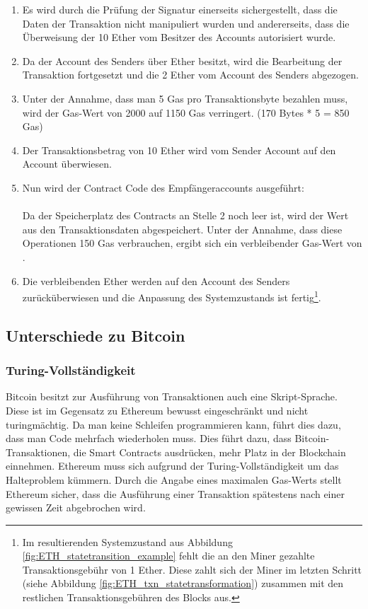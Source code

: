 \begin{enumerate}
\item Es wird durch die Prüfung der Signatur einerseits sichergestellt, dass die Daten der Transaktion nicht manipuliert wurden und andererseits, dass die Überweisung der 10 Ether vom Besitzer des Accounts  autorisiert wurde. 
\item Da der Account des Senders über  Ether besitzt, wird die Bearbeitung der Transaktion fortgesetzt und die 2 Ether vom Account des Senders abgezogen.
\item Unter der Annahme, dass man 5 Gas pro Transaktionsbyte bezahlen muss, wird der Gas-Wert von 2000 auf 1150 Gas verringert. (170 Bytes * 5 = 850 Gas) 
\item Der Transaktionsbetrag von 10 Ether wird vom Sender Account  auf den Account  überwiesen.
\item Nun wird der Contract Code des Empfängeraccounts ausgeführt:\\ \\
Da der Speicherplatz des Contracts an Stelle 2 noch leer ist, wird  der Wert  aus den Transaktionsdaten abgespeichert. Unter der Annahme, dass diese Operationen 150 Gas verbrauchen, ergibt sich ein verbleibender Gas-Wert von . 
\item Die verbleibenden  Ether werden auf den Account des Senders zurücküberwiesen und die Anpassung des Systemzustands ist fertig\footnote{Im resultierenden Systemzustand aus Abbildung \ref{fig:ETH_statetransition_example} fehlt die an den Miner gezahlte Transaktionsgebühr von 1 Ether. Diese zahlt sich der Miner im letzten Schritt (siehe Abbildung \ref{fig:ETH_txn_statetransformation}) zusammen mit den restlichen Transaktionsgebühren des Blocks aus.}.
\end{enumerate}

\subsection{Unterschiede zu Bitcoin}\label{eth_grundlagen_btc_diff} 
\subsubsection{Turing-Vollständigkeit}
Bitcoin besitzt zur Ausführung von Transaktionen auch eine Skript-Sprache. Diese ist im Gegensatz zu Ethereum bewusst eingeschränkt und nicht turingmächtig. Da man keine Schleifen programmieren kann, führt dies dazu, dass man Code mehrfach wiederholen muss. Dies führt dazu, dass Bitcoin-Transaktionen, die Smart Contracts ausdrücken, mehr Platz in der Blockchain einnehmen. Ethereum muss sich aufgrund der Turing-Vollständigkeit um das Halteproblem kümmern. Durch die Angabe eines maximalen Gas-Werts stellt Ethereum sicher, dass die Ausführung einer Transaktion spätestens nach einer gewissen Zeit abgebrochen wird. 
